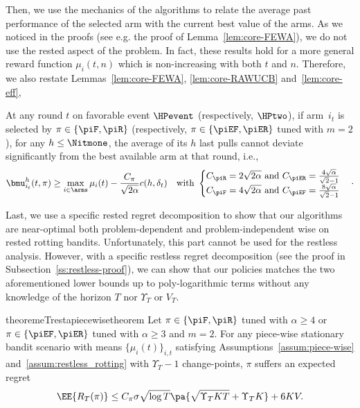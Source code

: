 Then, we use the mechanics of the algorithms to relate the average past performance of the selected arm with the current best value of the arms. As we noticed in the proofs (see e.g. the proof of Lemma~\ref{lem:core-FEWA}), we do not use the rested aspect of the problem. In fact, these results hold for a more general reward function $\mu_i(t,n)$ which is non-increasing with both $t$ and $n$. Therefore, we also restate Lemmas~\ref{lem:core-FEWA}, \ref{lem:core-RAWUCB} and~\ref{lem:core-eff},
\begin{lemma}
\label{lem:core-full}
At any round $t$ on favorable event $\HPevent$ (respectively, $\HPtwo$), if arm~$i_{t}$ is selected by $\pi \in \left\{\piF, \piR\right\}$ (respectively, $\pi \in \left\{\piEF, \piER\right\} $ tuned with $m=2$), for any $h \leq \Nitmone$,  the average of its $h$ last pulls cannot deviate significantly from the best available arm at that round, i.e.,
\begin{equation*}
\bmu^{h}_{i_t}(t,\pi) \geq \max_{i \in \arms} \mu_{i}(t)- \frac{C_\pi}{\sqrt{2\alpha}} c(h, \delta_t) \quad \text{with } 
\begin{cases}
C_{\piR} = 2\sqrt{2\alpha} \text{ and } C_{\piER} = \frac{4\sqrt{\alpha}}{\sqrt{2}-1}\\
C_{\piF} = 4\sqrt{2\alpha} \text{ and }C_{\piEF} = \frac{8\sqrt{\alpha}}{\sqrt{2}-1}
\end{cases}\cdot
\end{equation*}
\end{lemma}
Last, we use a specific rested regret decomposition to show that our algorithms are near-optimal both problem-dependent and problem-independent wise on rested rotting bandits. Unfortunately, this part cannot be used for the restless analysis. However, with a specific restless regret decomposition (see the proof in Subsection~\ref{ss:restless-proof}), we can show that our policies matches the two aforementioned lower bounds up to poly-logarithmic terms without any knowledge of the horizon $T$ nor $\Upsilon_T$ or $V_T$.
%
\begin{tBox}
\begin{restatable}{theoremeT}{restapiecewisetheorem}
\label{th:piecewise-minimax}
Let $\pi \in \left\{ \piF, \piR\right\}$ tuned with $\alpha \geq 4$ or $\pi \in \left\{ \piEF, \piER\right\}$ tuned with $\alpha \geq 3$ and $m=2$. For any piece-wise stationary bandit scenario with means $\{\mu_i(t)\}_{i,t}$ satisfying Assumptions~\ref{assum:piece-wise} and~\ref{assum:restless_rotting}  with $\Upsilon_T-1$ change-points, $\pi$  suffers an expected regret\,
\[
\EE{R_T(\pi)} \leq C_\pi \sigma \sqrt{\log{T}} \pa{ \sqrt{\Upsilon_T KT} + \Upsilon_T K} + 6KV.
\]
\end{restatable}
\end{tBox}

